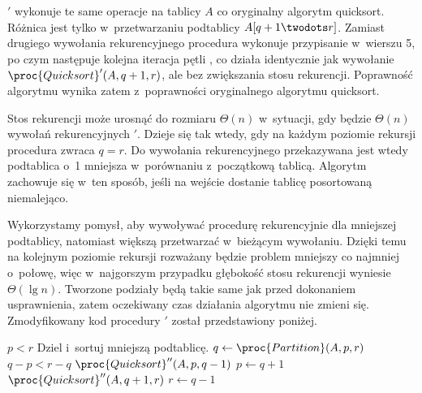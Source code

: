 
\subproblem %
$'$ wykonuje te same operacje na tablicy $A$ co oryginalny algorytm quicksort.
Różnica jest tylko w~przetwarzaniu podtablicy $A[q+1\twodots r]$.
Zamiast drugiego wywołania rekurencyjnego procedura wykonuje przypisanie w~wierszu 5, po czym następuje kolejna iteracja pętli , co działa identycznie jak wywołanie $\proc{Quicksort}'(A,q+1,r)$, ale bez zwiększania stosu rekurencji.
Poprawność algorytmu wynika zatem z~poprawności oryginalnego algorytmu quicksort.

\subproblem %
Stos rekurencji może urosnąć do rozmiaru $\Theta(n)$ w~sytuacji, gdy będzie $\Theta(n)$ wywołań rekurencyjnych $'$.
Dzieje się tak wtedy, gdy na każdym poziomie rekursji procedura  zwraca $q=r$.
Do wywołania rekurencyjnego przekazywana jest wtedy podtablica o~1 mniejsza w~porównaniu z~początkową tablicą.
Algorytm zachowuje się w~ten sposób, jeśli na wejście dostanie tablicę posortowaną niemalejąco.

\subproblem %
Wykorzystamy pomysł, aby wywoływać procedurę rekurencyjnie dla mniejszej podtablicy, natomiast większą przetwarzać w~bieżącym wywołaniu.
Dzięki temu na kolejnym poziomie rekursji rozważany będzie problem mniejszy co najmniej o~połowę, więc w~najgorszym przypadku głębokość stosu rekurencji wyniesie $\Theta(\lg n)$.
Tworzone podziały będą takie same jak przed dokonaniem usprawnienia, zatem oczekiwany czas działania algorytmu nie zmieni się.
Zmodyfikowany kod procedury $'$ został przedstawiony poniżej.
\begin{codebox}
\li	\While $p<r$
\li		\Do
			\Comment Dziel i~sortuj mniejszą podtablicę.
\li			$q\gets\proc{Partition}(A,p,r)$
\li			\If $q-p<r-q$
\li				\Then
					$\proc{Quicksort}''(A,p,q-1)$
\li					$p\gets q+1$
\li				\Else
					$\proc{Quicksort}''(A,q+1,r)$
\li					$r\gets q-1$
				\End
		\End
\end{codebox}
